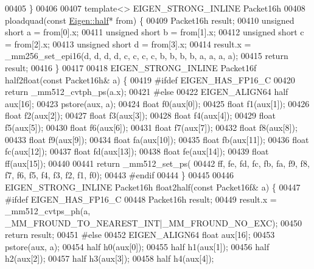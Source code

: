 \begin{DoxyCode}
00405 \}
00406 
00407 \textcolor{keyword}{template}<> EIGEN\_STRONG\_INLINE Packet16h
00408 ploadquad(\textcolor{keyword}{const} \hyperlink{struct_eigen_1_1half}{Eigen::half}* from) \{
00409   Packet16h result;
00410   \textcolor{keywordtype}{unsigned} \textcolor{keywordtype}{short} a = from[0].x;
00411   \textcolor{keywordtype}{unsigned} \textcolor{keywordtype}{short} b = from[1].x;
00412   \textcolor{keywordtype}{unsigned} \textcolor{keywordtype}{short} c = from[2].x;
00413   \textcolor{keywordtype}{unsigned} \textcolor{keywordtype}{short} d = from[3].x;
00414   result.x = \_mm256\_set\_epi16(d, d, d, d, c, c, c, c, b, b, b, b, a, a, a, a);
00415   \textcolor{keywordflow}{return} result;
00416 \}
00417 
00418 EIGEN\_STRONG\_INLINE Packet16f half2float(\textcolor{keyword}{const} Packet16h& a) \{
00419 \textcolor{preprocessor}{#ifdef EIGEN\_HAS\_FP16\_C}
00420   \textcolor{keywordflow}{return} \_mm512\_cvtph\_ps(a.x);
00421 \textcolor{preprocessor}{#else}
00422   EIGEN\_ALIGN64 half aux[16];
00423   pstore(aux, a);
00424   \textcolor{keywordtype}{float} f0(aux[0]);
00425   \textcolor{keywordtype}{float} f1(aux[1]);
00426   \textcolor{keywordtype}{float} f2(aux[2]);
00427   \textcolor{keywordtype}{float} f3(aux[3]);
00428   \textcolor{keywordtype}{float} f4(aux[4]);
00429   \textcolor{keywordtype}{float} f5(aux[5]);
00430   \textcolor{keywordtype}{float} f6(aux[6]);
00431   \textcolor{keywordtype}{float} f7(aux[7]);
00432   \textcolor{keywordtype}{float} f8(aux[8]);
00433   \textcolor{keywordtype}{float} f9(aux[9]);
00434   \textcolor{keywordtype}{float} fa(aux[10]);
00435   \textcolor{keywordtype}{float} fb(aux[11]);
00436   \textcolor{keywordtype}{float} fc(aux[12]);
00437   \textcolor{keywordtype}{float} fd(aux[13]);
00438   \textcolor{keywordtype}{float} fe(aux[14]);
00439   \textcolor{keywordtype}{float} ff(aux[15]);
00440 
00441   \textcolor{keywordflow}{return} \_mm512\_set\_ps(
00442       ff, fe, fd, fc, fb, fa, f9, f8, f7, f6, f5, f4, f3, f2, f1, f0);
00443 \textcolor{preprocessor}{#endif}
00444 \}
00445 
00446 EIGEN\_STRONG\_INLINE Packet16h float2half(\textcolor{keyword}{const} Packet16f& a) \{
00447 \textcolor{preprocessor}{#ifdef EIGEN\_HAS\_FP16\_C}
00448   Packet16h result;
00449   result.x = \_mm512\_cvtps\_ph(a, \_MM\_FROUND\_TO\_NEAREST\_INT|\_MM\_FROUND\_NO\_EXC);
00450   \textcolor{keywordflow}{return} result;
00451 \textcolor{preprocessor}{#else}
00452   EIGEN\_ALIGN64 \textcolor{keywordtype}{float} aux[16];
00453   pstore(aux, a);
00454   half h0(aux[0]);
00455   half h1(aux[1]);
00456   half h2(aux[2]);
00457   half h3(aux[3]);
00458   half h4(aux[4]);

\end{DoxyCode}
